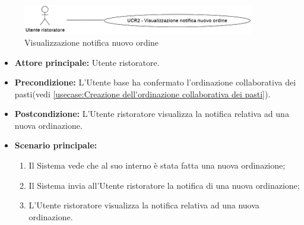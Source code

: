 \label{usecase:Visualizzazione notifica nuovo ordine}

\begin{figure}[h]
	\centering
	\includegraphics[width=0.9\textwidth]{./uml/UCR2.png} 
	\caption{Visualizzazione notifica nuovo ordine}
	\label{fig:UCR2}
  \end{figure}

\begin{itemize}
	\item \textbf{Attore principale:} Utente ristoratore.

	\item \textbf{Precondizione:} L'Utente base ha confermato l'ordinazione collaborativa dei pasti(vedi \autoref{usecase:Creazione dell'ordinazione collaborativa dei pasti}).

	\item \textbf{Postcondizione:} L'Utente ristoratore visualizza la notifica relativa ad una nuova ordinazione.

	\item \textbf{Scenario principale:}
	      \begin{enumerate}
		      \item Il Sistema vede che al suo interno è stata fatta una nuova ordinazione;
		      \item Il Sistema invia all'Utente ristoratore la notifica di una nuova ordinazione;
		      \item L'Utente ristoratore visualizza la notifica relativa ad una nuova ordinazione.
	      \end{enumerate}
\end{itemize}
